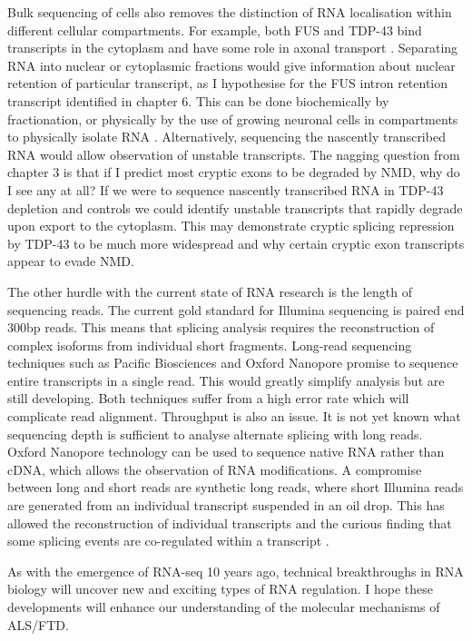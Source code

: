 Bulk sequencing of cells also removes the distinction of RNA localisation within different cellular compartments. %
For example, both FUS and TDP-43 bind transcripts in the cytoplasm and have some role in axonal transport \citep{Fallini2012,Fujii2005}. %
Separating RNA into nuclear or cytoplasmic fractions would give information about nuclear retention of particular transcript, as I hypothesise for the FUS intron retention transcript identified in chapter 6.
This can be done biochemically by fractionation, or physically by the use of growing neuronal cells in compartments to physically isolate RNA \citep{Taliaferro2016}.
Alternatively, sequencing the nascently transcribed RNA would allow observation of unstable transcripts.
The nagging question from chapter 3 is that if I predict most cryptic exons to be degraded by NMD, why do I see any at all?
If we were to sequence nascently transcribed RNA in TDP-43 depletion and controls we could identify unstable transcripts that rapidly degrade upon export to the cytoplasm.
This may demonstrate cryptic splicing repression by TDP-43 to be much more widespread and why certain cryptic exon transcripts appear to evade NMD.

The other hurdle with the current state of RNA research is the length of sequencing reads.
The current gold standard for Illumina sequencing is paired end 300bp reads.
This means that splicing analysis requires the reconstruction of complex isoforms from individual short fragments.
Long-read sequencing techniques such as Pacific Biosciences and Oxford Nanopore promise to sequence entire transcripts in a single read.
This would greatly simplify analysis but are still developing. 
Both techniques suffer from a high error rate which will complicate read alignment. 
Throughput is also an issue. It is not yet known what sequencing depth is sufficient to analyse alternate splicing with long reads.
Oxford Nanopore technology can be used to sequence native RNA rather than cDNA, which allows the observation of RNA modifications.
A compromise between long and short reads are synthetic long reads, where short Illumina reads are generated from an individual transcript suspended in an oil drop. 
This has allowed the reconstruction of individual transcripts and the curious finding that some splicing events are co-regulated within a transcript \citep{Tilgner2015}.

As with the emergence of RNA-seq 10 years ago, technical breakthroughs in RNA biology will uncover new and exciting types of RNA regulation.
I hope these developments will enhance our understanding of the molecular mechanisms of ALS/FTD.

